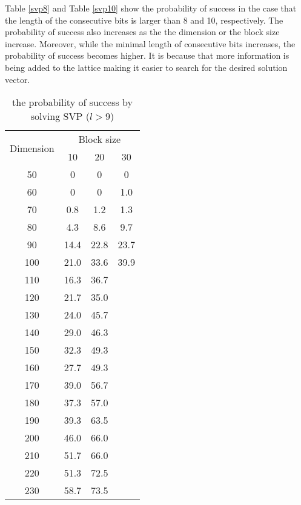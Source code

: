 Table \ref{svp8} and Table \ref{svp10} show the probability of success in the case that the length of the consecutive bits is larger than 8 and 10, respectively.
The probability of success also increases as the the dimension or the block size increase.
Moreover, while the minimal length of consecutive bits increases, the probability of success becomes higher.
It is because that more information is being added to the lattice making it easier to search for the desired solution vector.

\begin{table}
  \centering
  \caption{the probability of success by solving SVP ($l > 9$)}
  \label{svp9}
    \begin{tabular}{|c|c|c|c|}
    \hline
    \multirow{2}{*}{Dimension}&
    \multicolumn{3}{c|}{Block size} \\%
    \cline{2-4}
    & 10 & 20 & 30\\
  \hline
  50 & 0 & 0 & 0 \\
  \hline
  60 & 0 & 0 & 1.0 \\
  \hline
  70 & 0.8 & 1.2  & 1.3 \\
  \hline
  80 & 4.3 & 8.6 &  9.7 \\
  \hline
  90 & 14.4 & 22.8 & 23.7 \\
  \hline
  100 & 21.0 & 33.6 & 39.9 \\
  \hline
  110 & 16.3 & 36.7 &  \\
  \hline
  120 & 21.7 & 35.0 &  \\
  \hline
  130 & 24.0 & 45.7 &  \\
  \hline
  140 & 29.0 & 46.3 &  \\
  \hline
  150 & 32.3 & 49.3 &  \\
  \hline
  160 & 27.7 & 49.3 &  \\
  \hline
  170 & 39.0 & 56.7 &  \\
  \hline
  180 & 37.3 & 57.0 &  \\
  \hline
  190 & 39.3 & 63.5 &  \\
  \hline
  200 & 46.0 & 66.0 &  \\
  \hline
  210 & 51.7 & 66.0 &  \\
  \hline
  220 & 51.3 & 72.5 &  \\
  \hline
  230 & 58.7 & 73.5 &  \\
  \hline
    \end{tabular}
\end{table}

